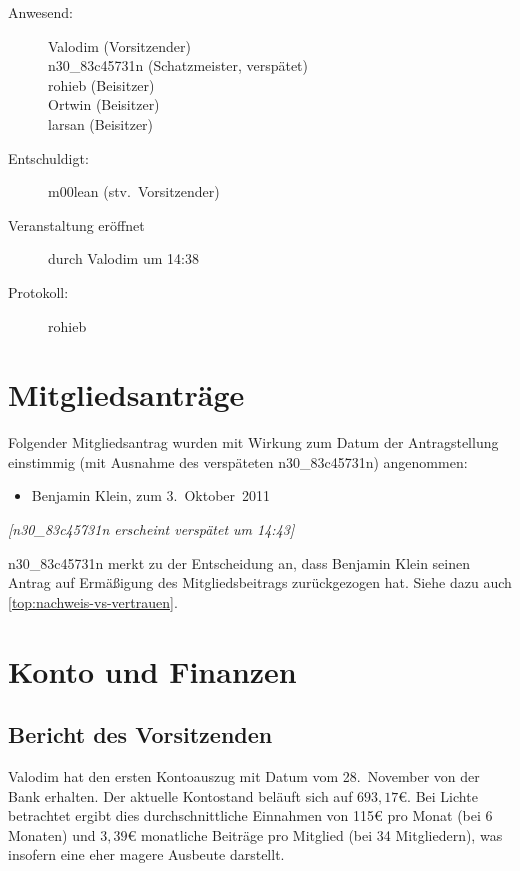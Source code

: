 \documentclass[a4paper,12pt]{scrartcl}
\title{\mytitle}
\date{\mydate}
\begin{document}
\maketitle

\begin{description}
 \item[Anwesend:] Valodim (Vorsitzender) \\
    n30\_83c45731n (Schatzmeister, verspätet) \\
    rohieb (Beisitzer) \\
    Ortwin (Beisitzer) \\
    larsan (Beisitzer)
  \item[Entschuldigt:] m00lean (stv.~Vorsitzender)
  \item[Veranstaltung eröffnet] durch Valodim um 14:38
  \item[Protokoll:] rohieb
\end{description}

\section{Mitgliedsanträge}
Folgender Mitgliedsantrag wurden mit Wirkung zum Datum der Antragstellung 
einstimmig (mit Ausnahme des verspäteten n30\_83c45731n) angenommen:
\begin{itemize}
 \item Benjamin Klein, zum 3.~Oktober~2011
\end{itemize}

\emph{[n30\_83c45731n erscheint verspätet um 14:43]}

n30\_83c45731n merkt zu der Entscheidung an, dass Benjamin Klein seinen Antrag
auf Ermäßigung des Mitgliedsbeitrags zurückgezogen hat. Siehe dazu auch 
\ref{top:nachweis-vs-vertrauen}.

\section{Konto und Finanzen}
\label{top:finanzen}
\subsection{Bericht des Vorsitzenden}
Valodim hat den ersten Kontoauszug mit Datum vom 28.~November von der Bank 
erhalten. Der aktuelle Kontostand beläuft sich auf $693{,}17$€. Bei Lichte 
betrachtet ergibt dies durchschnittliche Einnahmen von 115€ pro Monat (bei 
6 Monaten) und $3{,}39$€ monatliche Beiträge pro Mitglied (bei 34 Mitgliedern), 
was insofern eine eher magere Ausbeute darstellt.
\end{document}
